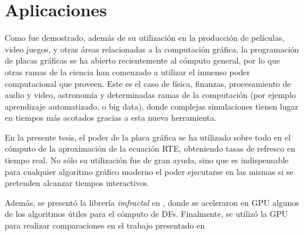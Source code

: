 
\section{Aplicaciones}
Como fue demostrado, además de su utilización en la producción de películas, video juegos, y otras áreas relacionadas a la computación gráfica, la programación de placas gráficas se ha abierto recientemente al cómputo general, por lo que otras ramas de la ciencia han comenzado a utilizar el inmenso poder computacional que proveen.
Este es el caso de física, finanzas, procesamiento de audio y video, astronomía y determinadas ramas de la computación (por ejemplo aprendizaje automatizado, o big data), donde complejas simulaciones tienen lugar en tiempos más acotados gracias a esta nueva herramienta.

En la presente tesis, el poder de la placa gráfica se ha utilizado sobre todo en el cómputo de la aproximación de la ecuación RTE, obteniendo tasas de refresco en tiempo real.
No sólo su utilización fue de gran ayuda, sino que es indispensable para cualquier algoritmo gráfico moderno el poder ejecutarse en las mismas si se pretenden alcanzar tiempos interactivos.

Además, se presentó la librería {\em imfractal} en \cite{Baravalle2013}, donde se aceleraron en GPU algunos de los algoritmos útiles para el cómputo de DFs.
Finalmente, se utilizó la GPU para realizar comparaciones en el trabajo presentado en \cite{Baravalle2014_2}

